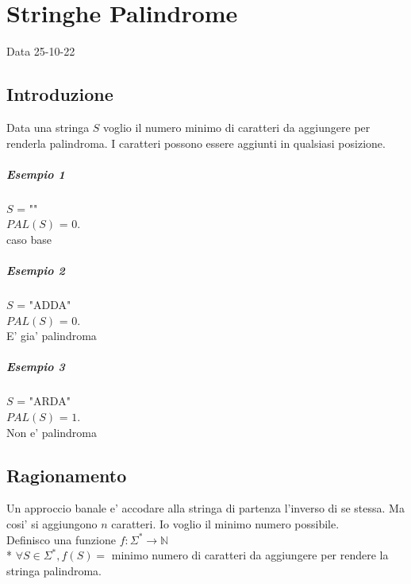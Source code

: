 \chapter{Stringhe Palindrome}
Data 25-10-22

\section{Introduzione}

Data una stringa $S$ voglio il numero minimo di caratteri da aggiungere per renderla palindroma.
I caratteri possono essere aggiunti in qualsiasi posizione.

\paragraph{Esempio 1}

$S$ = "" \\
$PAL(S)$ = $0$. \\
caso base

\paragraph{Esempio 2}

$S$ = "ADDA" \\
$PAL(S)$ = $0$. \\
E' gia' palindroma

\paragraph{Esempio 3}

$S$ = "ARDA" \\
$PAL(S)$ = $1$. \\
Non e' palindroma

\section{Ragionamento}

Un approccio banale e' accodare alla stringa di partenza l'inverso di se stessa.
Ma cosi' si aggiungono $n$ caratteri. Io voglio il minimo numero possibile. \\

Definisco una funzione $f : \Sigma^* \rightarrow \mathbb{N}$ \\*
$\forall S \in \Sigma^*, f(S) = $ minimo numero di caratteri da aggiungere per rendere la stringa palindroma. \\

